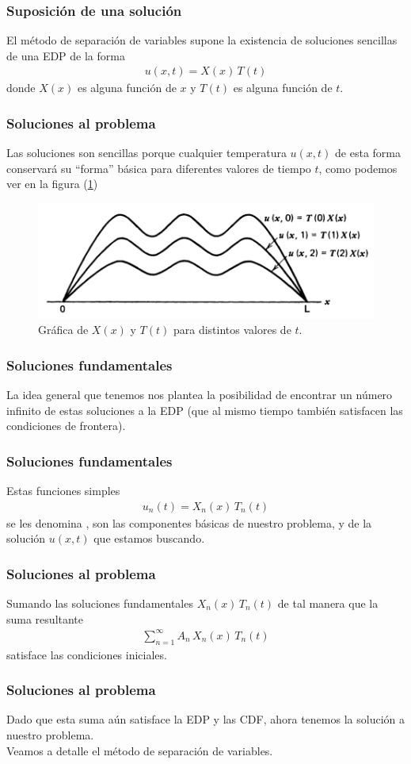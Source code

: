 \documentclass[12pt]{beamer}
\begin{document}
\begin{frame}
\frametitle{Suposición de una solución}
El método de separación de variables supone la existencia de soluciones sencillas de una EDP de la forma
\begin{align*}
u(x, t) =  X(x) \, T(t)
\end{align*}
donde $X (x)$ es alguna función de $x$ y $T (t)$ es alguna función de $t$.
\end{frame}
\begin{frame}
\frametitle{Soluciones al problema}
Las soluciones son sencillas porque cualquier temperatura $u (x, t)$ de esta forma conservará su \enquote{forma} básica para diferentes valores de tiempo $t$, como podemos ver en la figura (\ref{fig:figura_separacion_variables_01})
\begin{figure}[H]
    \centering
    \includegraphics[scale=0.25]{Imagenes/Separacion_Variables_01.png}
    \caption{Gráfica de $X(x)$ y $T(t)$ para distintos valores de $t$.}
    \label{fig:figura_separacion_variables_01}
\end{figure}
\end{frame}
\begin{frame}
\frametitle{Soluciones fundamentales}
La idea general que tenemos nos plantea la posibilidad de encontrar un número infinito de estas soluciones a la EDP (que al mismo tiempo también satisfacen las condiciones de frontera).
\end{frame}
\begin{frame}
\frametitle{Soluciones fundamentales}
Estas funciones simples
\begin{align*}
u_{n} (t) = X_{n} (x) \, T_{n}(t)
\end{align*}
se les denomina , son las componentes básicas de nuestro problema, y de la solución $u (x, t)$ que estamos buscando.
\end{frame}
\begin{frame}
\frametitle{Soluciones al problema}
Sumando las soluciones fundamentales $X_{n}(x) \, T_{n} (t)$ de tal manera que la suma resultante
\begin{align*}
\sum_{n=1}^{\infty} A_{n} \, X_{n} (x) \, T_{n} (t)
\end{align*}
satisface las condiciones iniciales.
\end{frame}
\begin{frame}
\frametitle{Soluciones al problema}
Dado que esta suma aún satisface la EDP y las CDF, ahora tenemos la solución a nuestro problema.
\\
\bigskip
\pause
Veamos a detalle el método de separación de variables.
\end{frame}
\end{document}
